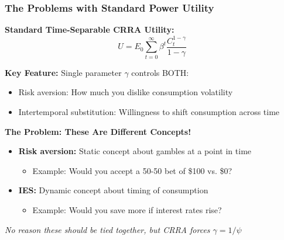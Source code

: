 \documentclass{beamer}
\begin{document}
\begin{frame}
    \frametitle{The Problems with Standard Power Utility}
    
    \textbf{Standard Time-Separable CRRA Utility:}
    \begin{equation*}
        U = E_0 \sum_{t=0}^{\infty} \beta^t \frac{C_t^{1-\gamma}}{1-\gamma}
    \end{equation*}
    
    
    \textbf{Key Feature:} Single parameter $\gamma$ controls BOTH:
    \begin{itemize}
        \item Risk aversion: How much you dislike consumption volatility
        \item Intertemporal substitution: Willingness to shift consumption across time
    \end{itemize}
    
    
    \textbf{The Problem: These Are Different Concepts!}
    \begin{itemize}
        \item \textbf{Risk aversion:} Static concept about gambles at a point in time
        \begin{itemize}
            \item Example: Would you accept a 50-50 bet of \$100 vs. \$0?
        \end{itemize}
        \item \textbf{IES:} Dynamic concept about timing of consumption
        \begin{itemize}
            \item Example: Would you save more if interest rates rise?
        \end{itemize}
    \end{itemize}
    
    
    \textit{No reason these should be tied together, but CRRA forces $\gamma = 1/\psi$}  
\end{frame}
\end{document}
